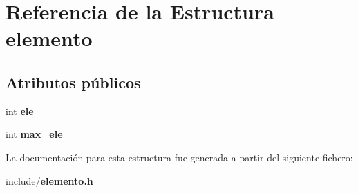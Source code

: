 \section{Referencia de la Estructura elemento}
\label{structelemento}
\subsection*{Atributos públicos}
\begin{DoxyCompactItemize}
\item 
int {\bfseries ele}\label{structelemento_a954579dc7ed0033eefa875742ece867b}

\item 
int {\bfseries max\+\_\+ele}\label{structelemento_abe7d5f0f605ec1757cd1d266a1d3007c}

\end{DoxyCompactItemize}


La documentación para esta estructura fue generada a partir del siguiente fichero\+:\begin{DoxyCompactItemize}
\item 
include/{\bf elemento.\+h}\end{DoxyCompactItemize}
